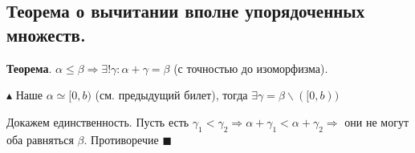 \subsection{Теорема о вычитании вполне упорядоченных множеств.}

\textbf{Теорема}. $\alpha \leqslant \beta \Rightarrow \exists! \gamma: \alpha + \gamma = \beta$ (с точностью до изоморфизма).

$\blacktriangle$
Наше $\alpha \simeq [0, b)$ (см. предыдущий билет), тогда $\exists \gamma = \beta \backslash ([0, b))$

Докажем единственность. Пусть есть $\gamma_1 < \gamma_2 \Rightarrow \alpha + \gamma_1 < \alpha + \gamma_2 \Rightarrow$ они не могут оба равняться $\beta$. Противоречие
$\blacksquare$
